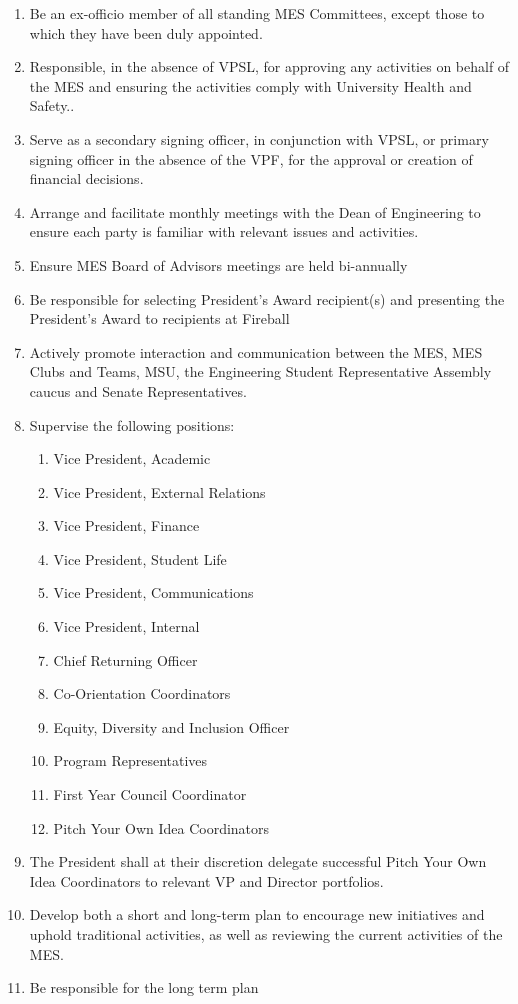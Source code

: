 \begin{enumerate}
  \begin{enumerate}
   \item
    Canadian Federation of Engineering Students (CFES)
   \item
    Engineering Student Societies' Council of Ontario (ESSCO)
  \end{enumerate}
 \item
  Be an ex-officio member of all standing MES Committees, except those to which they have been duly appointed.
 \item
  Responsible, in the absence of VPSL, for approving any activities on behalf of the MES and ensuring the activities comply with University Health and Safety..
 \item
  Serve as a secondary signing officer, in conjunction with VPSL, or primary signing officer in the absence of the VPF, for the approval or creation of financial decisions.
 \item
  Arrange and facilitate monthly meetings with the Dean of Engineering to ensure each party is familiar with relevant issues and activities.
 \item
  Ensure MES Board of Advisors meetings are held bi-annually
 \item
  Be responsible for selecting President's Award recipient(s) and presenting the President's Award to recipients at Fireball
 \item
  Actively promote interaction and communication between the MES, MES Clubs and Teams, MSU, the Engineering Student Representative Assembly caucus and Senate Representatives.
 \item
  Supervise the following positions:

  \begin{enumerate}
   \item
    Vice President, Academic
   \item
    Vice President, External Relations
   \item
    Vice President, Finance
   \item
    Vice President, Student Life
   \item
    Vice President, Communications
   \item
    Vice President, Internal
   \item
    Chief Returning Officer
   \item
    Co-Orientation Coordinators
   \item
    Equity, Diversity and Inclusion Officer
   \item
    Program Representatives
   \item
    First Year Council Coordinator
   \item
    Pitch Your Own Idea Coordinators
  \end{enumerate}
 \item
  The President shall at their discretion delegate successful Pitch Your Own Idea Coordinators to relevant VP and Director portfolios.
 \item
  Develop both a short and long-term plan to encourage new initiatives and uphold traditional activities, as well as reviewing the current activities of the MES.
 \item
  Be responsible for the long term plan


\end{enumerate}

